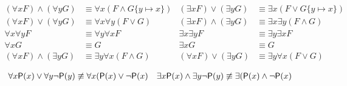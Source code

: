 \begin{lemma}
	\begin{align*}
		(\forall x F) \land (\forall y G) &\equiv \forall x (F\land G\{y\mapsto x\})
		&
		(\exists x F) \lor (\exists y G) &\equiv \exists x (F\lor G\{y\mapsto x\})
		\\
		(\forall x F) \lor (\forall y G) &\equiv \forall x\forall y (F\lor G)
		&
		(\exists x F) \land (\exists y G) &\equiv \exists x\exists y (F\land G)
		\\
		\forall x \forall y F &\equiv \forall y \forall x F
		&
		\exists x \exists y F &\equiv \exists y \exists x F
		\\
		\forall x G &\equiv G & \exists x G &\equiv G
		\\
		(\forall x F) \land (\exists y G) &\equiv \exists y \forall x (F\land G)
		&
		(\forall x F) \lor (\exists y G) &\equiv \exists y \forall x (F\lor G)
	\end{align*}
\end{lemma}

\begin{remark}
	\begin{align*}
	\forall x {\mathsf P}(x) \lor \forall y \lnot{\mathsf P}(y) &\not\equiv \forall x ({\mathsf P}(x)\lor\lnot{\mathsf P}(x)
	&
	\exists x {\mathsf P}(x) \land \exists y \lnot{\mathsf P}(y) &\not\equiv \exists  ({\mathsf P}(x)\land\lnot{\mathsf P}(x)
	\end{align*}
\end{remark}